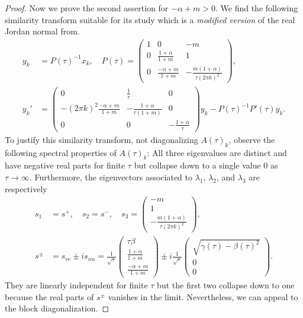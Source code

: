 \documentclass[a4paper,11pt]{article}
\def\k{(2\pi k)}
\theoremstyle{remark}
\begin{document}
\begin{proof}
Now we prove the second assertion for $-\alpha+m>0$. We find the following similarity transform suitable for its study which is a {\it modified version} of the real Jordan normal from.
\begin{align}
 y_k &= P(\tau)^{-1} x_k, \quad P(\tau) = \begin{pmatrix} 1 & 0 & -m\\0 & \frac{1+\alpha}{1+m} & 1\\0 & \frac{-\alpha+m}{1+m} & -\frac{m(1+\alpha)}{\tau\k^2}\end{pmatrix}, \\
 y_k' &= \begin{pmatrix} 0 & \frac{1}{\tau} & 0\\-\k^2\frac{-\alpha+m}{1+m} & -\frac{1+\alpha}{\tau(1+m)} & 0\\0 & 0 & -\frac{1+\alpha}{\tau}\end{pmatrix} y_k - P(\tau)^{-1}P'(\tau) y_k. \label{eq:block1}
\end{align}
To justify this similarity transform, not diagonalizing $A(\tau)_k$, observe the following spectral properties of $A(\tau)_k$: All three eigenvalues are distinct and have negative real parts for finite $\tau$ but collapse down to a single value $0$ as $\tau \rightarrow \infty.$ Furthermore, the eigenvectors associated to $\lambda_1$, $\lambda_2$, and $\lambda_3$ are respectively
\begin{align*}
 s_1&=s^+, \quad s_2=s^-, \quad s_3 = \begin{pmatrix} -m\\1\\ -\frac{m(1+\alpha)}{\tau\k^2} \end{pmatrix},\\
 s^\pm &= s_{re} \pm is_{im} = \frac{1}{\sqrt{\tau}} \begin{pmatrix} \tau\beta \\ \frac{1+\alpha}{1+m} \\ \frac{-\alpha+m}{1+m} \end{pmatrix} \pm i\frac{1}{\sqrt{\tau}}\begin{pmatrix}  \sqrt{\gamma(\tau)-\beta(\tau)^2}\\0\\0 \end{pmatrix}.
\end{align*}
They are linearly independent for finite $\tau$ but the first two collapse down to one because the real parts of $s^\pm$ vanishes in the limit. Nevertheless, we can appeal to the block diagonalization.


\end{proof}
\end{document}
